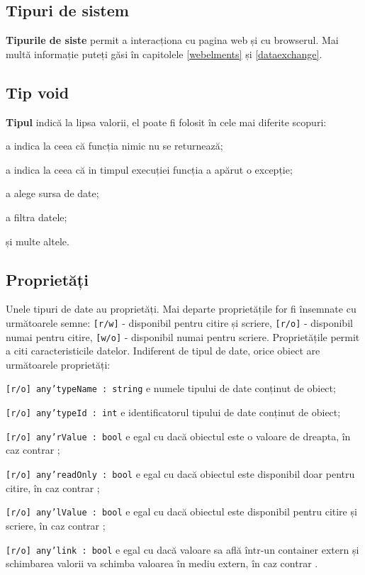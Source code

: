 \subsection{Tipuri de sistem}

{\bf Tipurile de siste} permit a interacționa cu pagina web și cu browserul. Mai multă informație puteți găsi în capitolele \ref{webelments} și \ref{dataexchange}.

\subsection{Tip void}

{\bf Tipul \void{}} indică la lipsa valorii, el poate fi folosit în cele mai diferite scopuri:

\begin{icItems}
\item
	a indica la ceea că funcția nimic nu se returnează;
\item
	a indica la ceea că in timpul execuției funcția a apărut o excepție;
\item
	a alege sursa de date;
\item
	a filtra datele;
\item
	și multe altele.
\end{icItems}


\subsection{Proprietăți}

Unele tipuri de date au proprietăți.
Mai departe proprietățile for fi însemnate cu următoarele semne: \texttt{[r/w]} - disponibil pentru citire și scriere, \texttt{[r/o]} - disponibil numai pentru citire, \texttt{[w/o]} - disponibil numai pentru scriere.
Proprietățile permit a citi caracteristicile datelor. Indiferent de tipul de date, orice obiect are următoarele proprietăți:

\begin{icItems}
\item
	\texttt{[r/o] any'typeName : string} e numele tipului de date conținut de obiect;
\item
	\texttt{[r/o] any'typeId : int} e identificatorul tipului de date conținut de obiect;
\item
	\texttt{[r/o] any'rValue : bool} e egal cu \true{} dacă obiectul este o valoare de dreapta, în caz contrar \false{};
\item
	\texttt{[r/o] any'readOnly : bool} e egal cu \true{} dacă obiectul este disponibil doar pentru citire, în caz contrar \false{};
\item
	\texttt{[r/o] any'lValue : bool} e egal cu \true{} dacă obiectul este disponibil pentru citire și scriere, în caz contrar \false{};
\item
	\texttt{[r/o] any'link : bool} e egal cu \true{} dacă valoare sa află într-un container extern și schimbarea valorii va schimba valoarea în mediu extern, în caz contrar \false{}.
\end{icItems}

